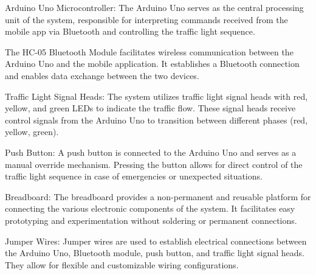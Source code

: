 \documentclass[conference, onecolumn]{IEEEtran}
\begin{document}
Arduino Uno Microcontroller: The Arduino Uno serves as the central processing unit of the system, responsible for interpreting commands received from the mobile app via Bluetooth and controlling the traffic light sequence.\par

The HC-05 Bluetooth Module facilitates wireless communication between the Arduino Uno and the mobile application. It establishes a Bluetooth connection and enables data exchange between the two devices.\par

Traffic Light Signal Heads: The system utilizes traffic light signal heads with red, yellow, and green LEDs to indicate the traffic flow. These signal heads receive control signals from the Arduino Uno to transition between different phases (red, yellow, green).\par

Push Button: A push button is connected to the Arduino Uno and serves as a manual override mechanism. Pressing the button allows for direct control of the traffic light sequence in case of emergencies or unexpected situations.\par

Breadboard: The breadboard provides a non-permanent and reusable platform for connecting the various electronic components of the system. It facilitates easy prototyping and experimentation without soldering or permanent connections.\par

Jumper Wires: Jumper wires are used to establish electrical connections between the Arduino Uno, Bluetooth module, push button, and traffic light signal heads. They allow for flexible and customizable wiring configurations.\par
\end{document}
